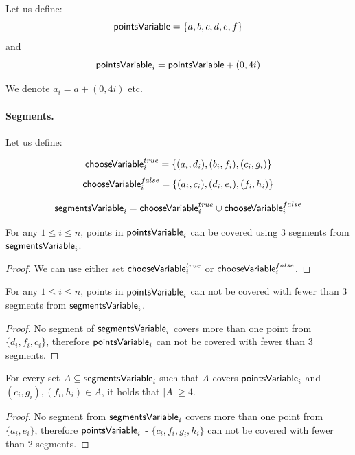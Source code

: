 Let us define: $$\mathsf{pointsVariable} =  \{a, b, c, d, e, f\}$$
and $$\mathsf{pointsVariable}_{i} = \mathsf{pointsVariable} + (0, 4i)$$

We denote $a_i = a + (0,4i)$ etc.

\paragraph{Segments.}

\newcommand{\xTrueSegment}[1]{(c_{#1}, g_{#1})}
\newcommand{\xFalseSegment}[1]{(f_{#1}, h_{#1})}
\newcommand{\orTrueSegment}[2]{(t_{#1, #2}, v_{#1, #2})}

Let us define:

$$\mathsf{chooseVariable}^{true}_{i} =\{ (a_i, d_i), (b_i, f_i), (c_i, g_i)\}$$
$$\mathsf{chooseVariable}^{false}_{i} = \{(a_i, c_i), (d_i, e_i), (f_i, h_i)\}$$

$$\mathsf{segmentsVariable}_{i} = \mathsf{chooseVariable}^{true}_{i} \cup \mathsf{chooseVariable}^{false}_{i}$$


\begin{lemma}
\label{choose_variables_solution}
For any $1 \le i \le n$, points in $\mathsf{pointsVariable}_{i}$
can be covered using 3 segments from $\mathsf{segmentsVariable}_{i}$.
\end{lemma}

\begin{proof}
We can use either set $\mathsf{chooseVariable}^{true}_{i}$ or $\mathsf{chooseVariable}^{false}_{i}$.
\end{proof}

\begin{lemma}
\label{choose_variables_no_less}
For any $1 \le i \le n$, points in $\mathsf{pointsVariable}_{i}$
can not be covered with fewer than 3 segments from $\mathsf{segmentsVariable}_{i}$.
\end{lemma}

\begin{proof}
No segment of $\mathsf{segmentsVariable}_{i}$ covers more than one point from
$\{d_i, f_i, c_i\}$, therefore $\mathsf{pointsVariable}_{i}$ can
not be covered with fewer than 3 segments.
\end{proof}

\begin{lemma}
\label{choose_variables_both}
For every set $A \subseteq \mathsf{segmentsVariable}_{i}$ such that $A$ covers $\mathsf{pointsVariable}_{i}$
and $\xTrueSegment{i}, \xFalseSegment{i} \in A$,
it holds that $|A| \ge 4$.
\end{lemma}
\begin{proof}
No segment from $\mathsf{segmentsVariable}_{i}$ covers more than one point from
$\{a_i, e_i\}$,
therefore 
$\mathsf{pointsVariable}_{i}$ - $\{c_i, f_i, g_i, h_i\}$
can not be covered with fewer than 2 segments.
\end{proof}


